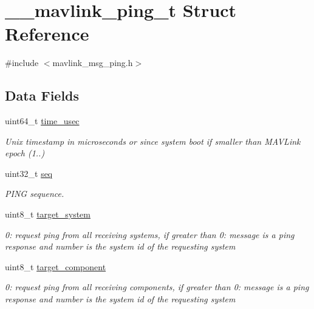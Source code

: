 \hypertarget{struct____mavlink__ping__t}{\section{\+\_\+\+\_\+mavlink\+\_\+ping\+\_\+t Struct Reference}
\label{struct____mavlink__ping__t}
}


{\ttfamily \#include $<$mavlink\+\_\+msg\+\_\+ping.\+h$>$}

\subsection*{Data Fields}
\begin{DoxyCompactItemize}
\item 
uint64\+\_\+t \hyperlink{struct____mavlink__ping__t_a78bf2339554a175c2b5423fee61cf619}{time\+\_\+usec}
\begin{DoxyCompactList}\small\item\em Unix timestamp in microseconds or since system boot if smaller than M\+A\+V\+Link epoch (1..) \end{DoxyCompactList}\item 
uint32\+\_\+t \hyperlink{struct____mavlink__ping__t_a753c4aa80232a414c05065646175bf46}{seq}
\begin{DoxyCompactList}\small\item\em P\+I\+N\+G sequence. \end{DoxyCompactList}\item 
uint8\+\_\+t \hyperlink{struct____mavlink__ping__t_a349dd7a0a95dc0a9faef1a498172efe3}{target\+\_\+system}
\begin{DoxyCompactList}\small\item\em 0\+: request ping from all receiving systems, if greater than 0\+: message is a ping response and number is the system id of the requesting system \end{DoxyCompactList}\item 
uint8\+\_\+t \hyperlink{struct____mavlink__ping__t_aea8c79743c35ac8e9d3d3362e2723f17}{target\+\_\+component}
\begin{DoxyCompactList}\small\item\em 0\+: request ping from all receiving components, if greater than 0\+: message is a ping response and number is the system id of the requesting system \end{DoxyCompactList}\end{DoxyCompactItemize}


